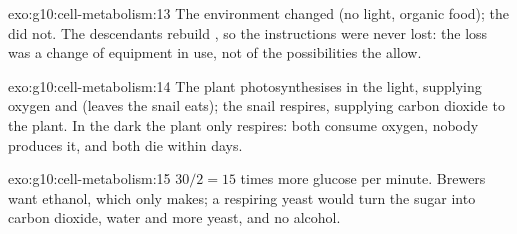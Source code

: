 \begin{solution}{exo:g10:cell-metabolism:13}
The environment changed (no light, organic food); the  did not.
The descendants rebuild , so the instructions were never
lost: the loss was a change of equipment in use, not of the
possibilities the  allow.
\end{solution}

\begin{solution}{exo:g10:cell-metabolism:14}
The plant photosynthesises in the light, supplying oxygen and  (leaves the snail eats); the snail respires, supplying carbon
dioxide to the plant. In the dark the plant only respires: both
consume oxygen, nobody produces it, and both die within days.
\end{solution}

\begin{solution}{exo:g10:cell-metabolism:15}
$30/2 = 15$ times more glucose per minute. Brewers want ethanol, which
only  makes; a respiring yeast would turn the sugar into
carbon dioxide, water and more yeast, and no alcohol.
\end{solution}

